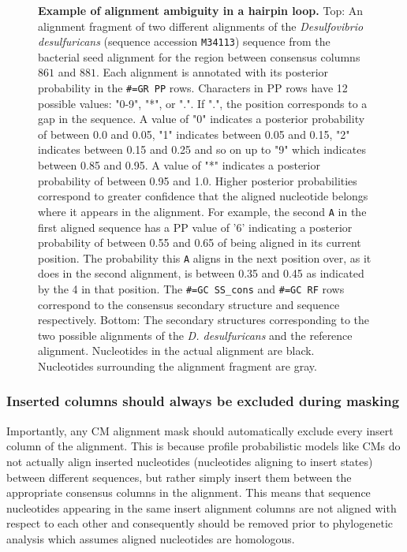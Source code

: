 \begin{figure}
\begin{center}
\caption[Example of alignment ambiguity in a hairpin loop.]{
  \textbf{Example of alignment ambiguity in a hairpin loop.}  Top: An
  alignment fragment of two different alignments of the
  \emph{Desulfovibrio desulfuricans} (sequence accession
  \texttt{M34113}) sequence from the  bacterial seed
  alignment for the region between consensus columns $861$ and $881$.
  Each alignment is annotated with its posterior probability in the
  \texttt{\#=GR PP} rows.  Characters in PP rows have 12 possible
  values: "0-9", "*", or ".". If ".", the position corresponds to a
  gap in the sequence. A value of "0" indicates a posterior
  probability of between 0.0 and 0.05, "1" indicates between 0.05 and
  0.15, "2" indicates between 0.15 and 0.25 and so on up to "9" which
  indicates between 0.85 and 0.95. A value of "*" indicates a
  posterior probability of between 0.95 and 1.0. Higher posterior
  probabilities correspond to greater confidence that the aligned
  nucleotide belongs where it appears in the alignment.  For example,
  the second \texttt{A} in the first aligned sequence has a PP value
  of '6' indicating a posterior probability of between 0.55 and 0.65
  of being aligned in its current position. The
  probability this \texttt{A} aligns in the next position over, as it
  does in the second alignment, is between 0.35 and 0.45 as indicated
  by the 4 in that position.  The \texttt{\#=GC
  SS\_cons} and \texttt{\#=GC RF} rows correspond to the consensus
  secondary structure and sequence respectively.  
  Bottom: The
  secondary structures corresponding to the two possible alignments of
  the \emph{D. desulfuricans} and the reference alignment.  Nucleotides
  in the actual alignment are black. Nucleotides surrounding the
  alignment fragment are gray.}
\end{center}
\label{fig:ambiguity}
\end{figure}

\subsubsection{Inserted columns should always be excluded during masking}

Importantly, any CM alignment mask should automatically exclude 
every insert column of the alignment. This is because profile
probabilistic models like CMs do not actually align inserted nucleotides
(nucleotides aligning to insert states) between different sequences, but
rather simply insert them between the appropriate consensus columns in
the alignment. This means that sequence nucleotides appearing in the same
insert alignment columns are not aligned with respect to each
other and consequently should be removed prior to phylogenetic
analysis which assumes aligned nucleotides are homologous.

